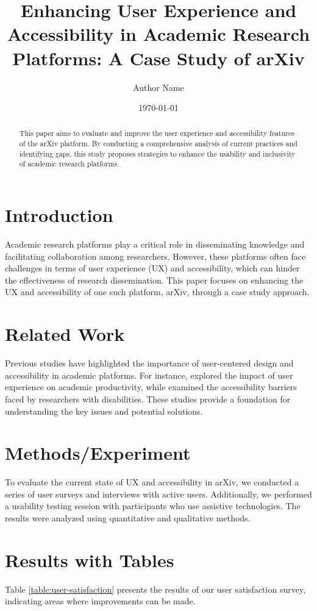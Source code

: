 \documentclass{article}
\title{Enhancing User Experience and Accessibility in Academic Research Platforms: A Case Study of arXiv}
\author{Author Name}
\date{\today}
\begin{document}
\maketitle

\begin{abstract}
This paper aims to evaluate and improve the user experience and accessibility features of the arXiv platform. By conducting a comprehensive analysis of current practices and identifying gaps, this study proposes strategies to enhance the usability and inclusivity of academic research platforms.
\end{abstract}

\section{Introduction}
Academic research platforms play a critical role in disseminating knowledge and facilitating collaboration among researchers. However, these platforms often face challenges in terms of user experience (UX) and accessibility, which can hinder the effectiveness of research dissemination. This paper focuses on enhancing the UX and accessibility of one such platform, arXiv, through a case study approach.

\section{Related Work}
Previous studies have highlighted the importance of user-centered design and accessibility in academic platforms. For instance, \cite{example1} explored the impact of user experience on academic productivity, while \cite{example2} examined the accessibility barriers faced by researchers with disabilities. These studies provide a foundation for understanding the key issues and potential solutions.

\section{Methods/Experiment}
To evaluate the current state of UX and accessibility in arXiv, we conducted a series of user surveys and interviews with active users. Additionally, we performed a usability testing session with participants who use assistive technologies. The results were analyzed using quantitative and qualitative methods.

\section{Results with Tables}
Table \ref{table:user-satisfaction} presents the results of our user satisfaction survey, indicating areas where improvements can be made.
\end{document}
